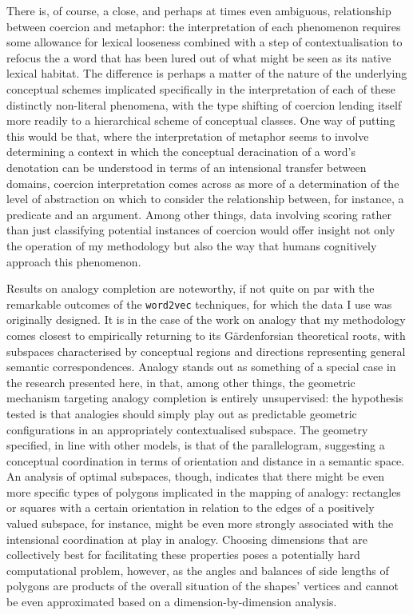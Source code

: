 There is, of course, a close, and perhaps at times even ambiguous, relationship between coercion and metaphor: the interpretation of each phenomenon requires some allowance for lexical looseness combined with a step of contextualisation to refocus the a word that has been lured out of what might be seen as its native lexical habitat.  The difference is perhaps a matter of the nature of the underlying conceptual schemes implicated specifically in the interpretation of each of these distinctly non-literal phenomena, with the type shifting of coercion lending itself more readily to a hierarchical scheme of conceptual classes.  One way of putting this would be that, where the interpretation of metaphor seems to involve determining a context in which the conceptual deracination of a word's denotation can be understood in terms of an intensional transfer between domains, coercion interpretation comes across as more of a determination of the level of abstraction on which to consider the relationship between, for instance, a predicate and an argument.  Among other things, data involving scoring rather than just classifying potential instances of coercion would offer insight not only the operation of my methodology but also the way that humans cognitively approach this phenomenon.

Results on analogy completion are noteworthy, if not quite on par with the remarkable outcomes of the \texttt{word2vec} techniques, for which the data I use was originally designed.  It is in the case of the work on analogy that my methodology comes closest to empirically returning to its G\"{a}rdenforsian theoretical roots, with subspaces characterised by conceptual regions and directions representing general semantic correspondences.  Analogy stands out as something of a special case in the research presented here, in that, among other things, the geometric mechanism targeting analogy completion is entirely unsupervised: the hypothesis tested is that analogies should simply play out as predictable geometric configurations in an appropriately contextualised subspace.  The geometry specified, in line with other models, is that of the parallelogram, suggesting a conceptual coordination in terms of orientation and distance in a semantic space.  An analysis of optimal subspaces, though, indicates that there might be even more specific types of polygons implicated in the mapping of analogy: rectangles or squares with a certain orientation in relation to the edges of a positively valued subspace, for instance, might be even more strongly associated with the intensional coordination at play in analogy.  Choosing dimensions that are collectively best for facilitating these properties poses a potentially hard computational problem, however, as the angles and balances of side lengths of polygons are products of the overall situation of the shapes' vertices and cannot be even approximated based on a dimension-by-dimension analysis.


